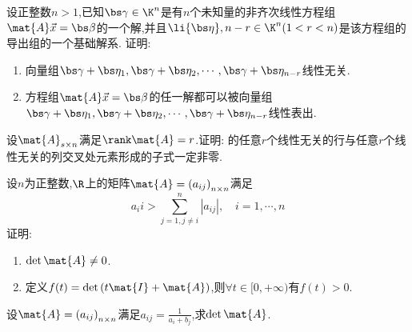 \documentclass{ctexart}
\begin{document}
\begin{homework}[4(10')]
    设正整数$n>1$,已知$\bs\gamma\in\K^n$是有$n$个未知量的非齐次线性方程组$\mat{A}\vec{x}=\bs\beta$的一个解,并且$\li{\bs\eta},{n-r}\in\K^n(1<r<n)$是该方程组的导出组的一个基础解系.
    证明:
    \begin{enumerate}
        \item 向量组$\bs\gamma+\bs\eta_1,\bs\gamma+\bs\eta_2,\cdots,\bs\gamma+\bs\eta_{n-r}$线性无关.
        \item 方程组$\mat{A}\vec{x}=\bs\beta$的任一解都可以被向量组$\bs\gamma+\bs\eta_1,\bs\gamma+\bs\eta_2,\cdots,\bs\gamma+\bs\eta_{n-r}$线性表出.
    \end{enumerate}
\end{homework}
\begin{homework}[5(10')]
    设$\mat{A}_{s\times n}$满足$\rank\mat{A}=r$.证明: 的任意$r$个线性无关的行与任意$r$个线性无关的列交叉处元素形成的子式一定非零.
\end{homework}
\begin{homework}[6(10')]
    设$n$为正整数,$\R$上的矩阵$\mat{A}=\left(a_{ij}\right)_{n\times n}$满足
    \[a_ii>\sum_{j=1,j\neq i}^{n}\left|a_{ij}\right|,\quad i=1,\cdots,n\]
    证明:
    \begin{enumerate}
        \item $\det\mat{A}\neq0$.
        \item 定义$f(t)=\det\left(t\mat{I}+\mat{A}\right)$,则$\forall t\in[0,+\infty)$有$f(t)>0$.
    \end{enumerate}
\end{homework}
\begin{homework}[7(10')]
    设$\mat{A}=\left(a_{ij}\right)_{n\times n}$满足$a_{ij}=\frac{1}{a_i+b_j}$,求$\det\mat{A}$.
\end{homework}
\end{document}
